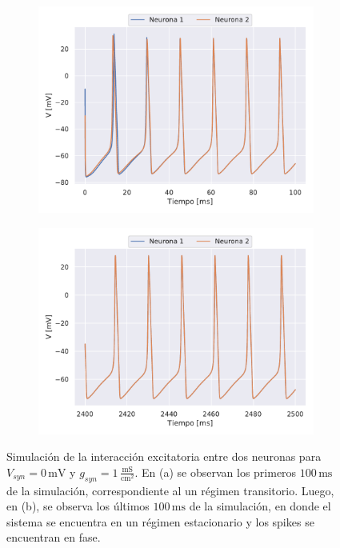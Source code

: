 \begin{figure}[hb!]
    \centering
    \begin{subfigure}[b]{0.48\textwidth}
        \includegraphics[width=\textwidth]{Excitatorio_inicio.pdf}
        \caption{}
        \label{Simulacion_Excitatorio_inicio}
    \end{subfigure}
    \hfill
    \begin{subfigure}[b]{0.48\textwidth}
        \includegraphics[width=\textwidth]{Excitatorio_final.pdf}
        \caption{}
        \label{Simulacion_Excitatorio_final}
    \end{subfigure}
    \caption{Simulación de la interacción excitatoria entre dos neuronas para $V_{syn}=0\,\text{mV}$ y $g_{syn}=1\,\frac{\text{mS}}{\text{cm}^2}$. En (a) se observan los primeros $100\,\text{ms}$ de la simulación, correspondiente al un régimen transitorio. Luego, en (b), se observa los últimos $100\,\text{ms}$ de la simulación, en donde el sistema se encuentra en un régimen estacionario y los spikes se encuentran en fase.}
    \label{ej01:Simulacion_Excitatorio}
\end{figure}

